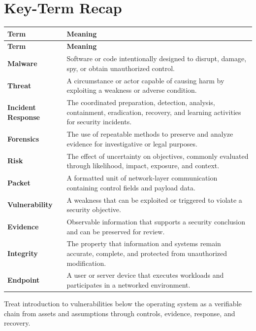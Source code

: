 \documentclass[11pt]{article}
\begin{document}
\section*{Key-Term Recap}
\begin{longtable}{>{\RaggedRight\arraybackslash}p{}>{\RaggedRight\arraybackslash}p{}}
\toprule\rowcolor{Navy}\color{white}\textbf{Term} & \color{white}\textbf{Meaning}\\\midrule
\endfirsthead
\toprule\rowcolor{Navy}\color{white}\textbf{Term} & \color{white}\textbf{Meaning}\\\midrule
\endhead
\textbf{Malware} & Software or code intentionally designed to disrupt, damage, spy, or obtain unauthorized control. \\\midrule
\textbf{Threat} & A circumstance or actor capable of causing harm by exploiting a weakness or adverse condition. \\\midrule
\textbf{Incident Response} & The coordinated preparation, detection, analysis, containment, eradication, recovery, and learning activities for security incidents. \\\midrule
\textbf{Forensics} & The use of repeatable methods to preserve and analyze evidence for investigative or legal purposes. \\\midrule
\textbf{Risk} & The effect of uncertainty on objectives, commonly evaluated through likelihood, impact, exposure, and context. \\\midrule
\textbf{Packet} & A formatted unit of network-layer communication containing control fields and payload data. \\\midrule
\textbf{Vulnerability} & A weakness that can be exploited or triggered to violate a security objective. \\\midrule
\textbf{Evidence} & Observable information that supports a security conclusion and can be preserved for review. \\\midrule
\textbf{Integrity} & The property that information and systems remain accurate, complete, and protected from unauthorized modification. \\\midrule
\textbf{Endpoint} & A user or server device that executes workloads and participates in a networked environment. \\\midrule
\bottomrule
\end{longtable}
\begin{takeawaybox}
Treat introduction to vulnerabilities below the operating system as a verifiable chain from assets and assumptions through controls, evidence, response, and recovery.
\end{takeawaybox}
\end{document}
